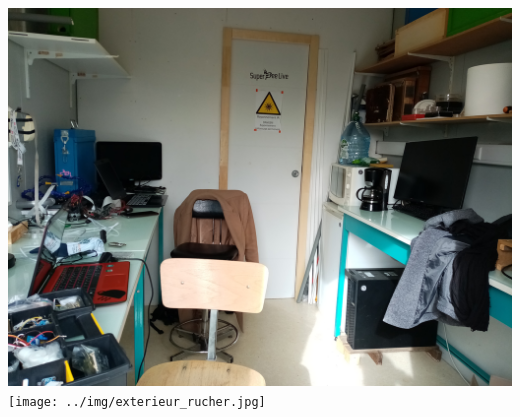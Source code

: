 \documentclass[12pt,french,a4paper]{article}
\begin{document}
\begin{center}	
\includegraphics[scale=0.075]{../img/interieur_rucher.jpg}
\label{intruch}
\texttt{[image: ../img/exterieur\_rucher.jpg]}
\label{extruch}
\end{center}
\end{document}
